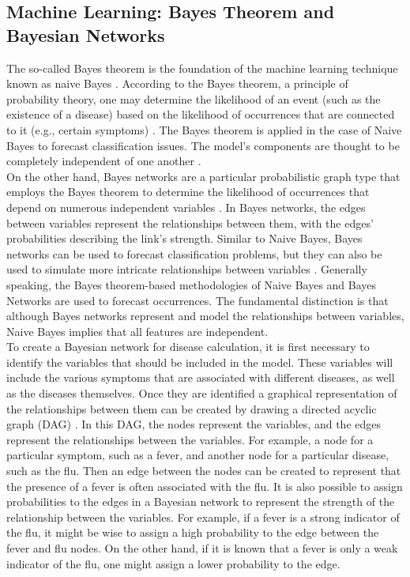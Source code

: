 \subsection{Machine Learning: Bayes Theorem and Bayesian Networks}
The so-called Bayes theorem is the foundation of the machine learning technique known as naive Bayes \cite[p. 403]{.bayes1}. According to the Bayes theorem, a principle of probability theory, one may determine the likelihood of an event (such as the existence of a disease) based on the likelihood of occurrences that are connected to it (e.g., certain symptoms) \cite[p. 403 ff.]{.bayes1} \cite{.bayes2}. The Bayes theorem is applied in the case of Naive Bayes to forecast classification issues. The model's components are thought to be completely independent of one another \cite{.naivebayes}.
\newline \\
On the other hand, Bayes networks are a particular probabilistic graph type that employs the Bayes theorem to determine the likelihood of occurrences that depend on numerous independent variables \cite{.bayesnet}. In Bayes networks, the edges between variables represent the relationships between them, with the edges' probabilities describing the link's strength. Similar to Naive Bayes, Bayes networks can be used to forecast classification problems, but they can also be used to simulate more intricate relationships between variables  \cite{.bayesnet}. Generally speaking, the Bayes theorem-based methodologies of Naive Bayes and Bayes Networks are used to forecast occurrences. The fundamental distinction is that although Bayes networks represent and model the relationships between variables, Naive Bayes implies that all features are independent. 
\newline \\
To create a Bayesian network for disease calculation, it is first necessary to identify the variables that should be included in the model. These variables will include the various symptoms that are associated with different diseases, as well as the diseases themselves. Once they are identified a graphical representation of the relationships between them can be created by drawing a directed acyclic graph (DAG) \cite{.bayesnet} \cite{.bayesnet2}. In this DAG, the nodes represent the variables, and the edges represent the relationships between the variables. For example, a node for a particular symptom, such as a fever, and another node for a particular disease, such as the flu. Then an edge between the nodes can be created to represent that the presence of a fever is often associated with the flu. It is also possible to assign probabilities to the edges in a Bayesian network to represent the strength of the relationship between the variables. For example, if a fever is a strong indicator of the flu, it might be wise to assign a high probability to the edge between the fever and flu nodes. On the other hand, if it is known that a fever is only a weak indicator of the flu, one might assign a lower probability to the edge.
